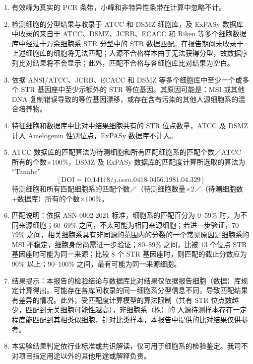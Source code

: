 \documentclass[UTF8,10pt,a4paper,fontset=fandol]{ctexart}
\begin{document}
\begin{enumerate}
\item 有效峰为真实的 PCR 条带，小峰和非特异性条带在计算中忽略不计。

\item 检测细胞的分型结果与收录于 ATCC 和 DSMZ 细胞库，及 ExPASy 数据库中收录的来自于 ATCC、DSMZ、JCRB、ECACC 和 Riken 等多个细胞数据库中经过十万余细胞系 STR 分型中的 STR 数据匹配。在报告期间未收录于上述细胞库的细胞将无法匹配；人源不合格样本由于无法获得分型，故数据序列比对结果将不会显示；此外，匹配不合格与各细胞库比对结果为空白。

\item 依据 ANSI/ATCC、JCRB、ECACC 和 DSMZ 等多个细胞库中至少一个或多个 STR 基因座中至少示额外的 STR 等位基因。其原因可能是：MSI 或其他 DNA 复制错误导致的等位基因漂移，或存在含有污染的其他人源细胞系的混合培养物。

\item 特征细胞和数据库中比对中结果细胞共有的 STR 位点数量，ATCC 及 DSMZ 计入 Amelogenin 性别位点，ExPASy 数据库不计入。

\item ATCC 数据库的匹配算法为待测细胞和所有匹配细胞系的匹配个数／ATCC 所有的个数$\times 100\%$，DSMZ 及 ExPASy 数据库的匹配度计算所选取的算法为 “Tanabe”
\[
[\mathrm{DOI}=10.14118/j.issn.0418\text{-}0456.1981.04.329]
\]
待测细胞和所有匹配细胞系的匹配个数／（待测细胞数量$\times 2$／（待测细胞数+数据库）所有的个数$\times 100\%$。

\item 匹配说明：依据 ASN-0002-2021 标准，细胞系的匹配百分为 $0$--$59\%$ 时，为不同来源细胞；$60$--$69\%$ 之间，不太可能为相同来源细胞；若进一步验证，$70$--$79\%$ 之间，相关细胞系具有非同源的范围内的分裂的一个常见原因是细胞系的 MSI 不稳定，细胞身份尚需进一步验证；$80$--$89\%$ 之间，比被 $13$ 个位点 STR 基因座时可能为同一来源；比较 $8$ 个 STR 基因座时，则匹配的截止分数应为 $90\%$ 以上；$90$--$100\%$ 之间，最有可能为同一来源细胞。

\item 结果提示：本报告的检验结论与数据库比对结果仅依据报告细胞（数据）库规定计算得出。可能存在各库间收录的同一细胞系分型信息不同，导致匹配结果有差异的情况。此外，受匹配度计算模型的算法限制（共有 STR 位点数越少，匹配到无关细胞可能性越高），非细胞系（株）的 人源待测样本存在一定程度能匹配到其相类似细胞，针对比类样本，本报告中提供的比对结果仅供参考。

\item 本实验结果判定依行业标准或共识解读，仅可用于细胞系的检验鉴定。我司不对项目指定用途以外的其他用途或解释负责。
\end{enumerate}
\end{document}
